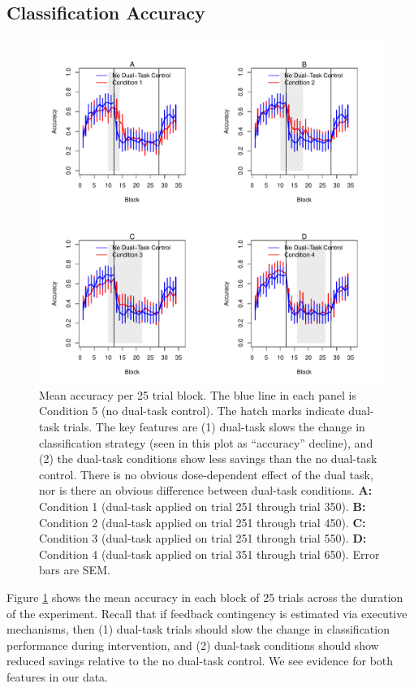 \documentclass[apacite,draftfirst,man]{apa6}
\begin{document}
\subsection*{Classification Accuracy}
\begin{figure}[t]
\centering \includegraphics[width=1.0\textwidth]{../figures/fig_learning_curves.pdf}
\caption{ Mean accuracy per 25 trial block. The blue line in each panel is
  Condition 5 (no dual-task control). The hatch marks indicate dual-task trials.
  The key features are (1) dual-task slows the change in classification strategy
  (seen in this plot as ``accuracy'' decline), and (2) the dual-task conditions
  show less savings than the no dual-task control. There is no obvious
  dose-dependent effect of the dual task, nor is there an obvious difference
  between dual-task conditions.
  \textbf{A:} Condition 1 (dual-task applied on trial 251 through trial 350).
  \textbf{B:} Condition 2 (dual-task applied on trial 251 through trial 450).
  \textbf{C:} Condition 3 (dual-task applied on trial 251 through trial 550).
  \textbf{D:} Condition 4 (dual-task applied on trial 351 through trial 650).
  Error bars are SEM. }
  \label{fig:learning_curves}
\end{figure}

Figure \ref{fig:learning_curves} shows the mean accuracy in each block of 25
trials across the duration of the experiment. Recall that if feedback
contingency is estimated via executive mechanisms, then (1) dual-task trials
should slow the change in classification performance during intervention, and
(2) dual-task conditions should show reduced savings relative to the no
dual-task control. We see evidence for both features in our data.
\end{document}
